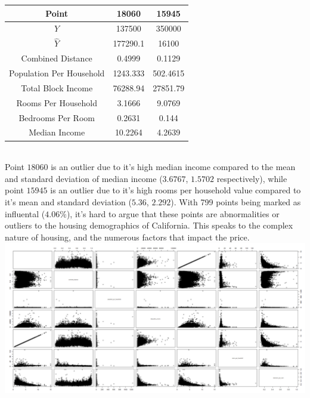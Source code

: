 \documentclass[10pt]{article}
\begin{document}
\begin{tabular}{|c|c|c|}
    \hline
     Point & 18060 & 15945 \\
    \hline
     $Y$ & 137500 & 350000\\
    \hline
     $\hat{Y}$ & 177290.1 & 16100 \\
    \hline
     Combined Distance & 0.4999 & 0.1129 \\
    \hline
     Population Per Household & 1243.333 & 502.4615\\
    \hline
     Total Block Income & 76288.94 & 27851.79 \\
    \hline
     Rooms Per Household & 3.1666 & 9.0769 \\
    \hline
     Bedrooms Per Room & 0.2631 & 0.144\\
    \hline
     Median Income & 10.2264 & 4.2639\\
    \hline
\end{tabular}
\\ \hspace*{2em}Point $18060$ is an outlier due to it's high median income compared to the mean and standard deviation of median income ($3.6767$, $1.5702$ respectively),
while point $15945$ is an outlier due to it's high rooms per household value compared to it's mean and standard deviation ($5.36$, $2.292$). With 799 points being marked as 
influental ($4.06\%$), it's hard to argue that these points are abnormalities or outliers to the housing demographics of California. This speaks to the complex
nature of housing, and the numerous factors that impact the price.\\

\includegraphics[scale=0.25]{matrix}
\end{document}
